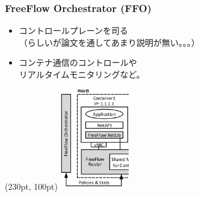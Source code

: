 \documentclass[dvipdfmx,9pt,notheorems]{beamer}
\theoremstyle{definition}
\begin{document}
\begin{frame}\frametitle{FreeFlow Orchestrator (FFO)}
	\begin{itemize}
		\item コントロールプレーンを司る \\
			   （らしいが論文を通してあまり説明が無い。。。）
		\item コンテナ通信のコントロールや \\
			    リアルタイムモニタリングなど。
  \end{itemize}
  \begin{textblock*}{0.4\linewidth} (230pt, 100pt)
  	\centering
  	\includegraphics[width=30mm]{fig/figure4-ffo.png}
  \end{textblock*}
\end{frame}

\end{document}
